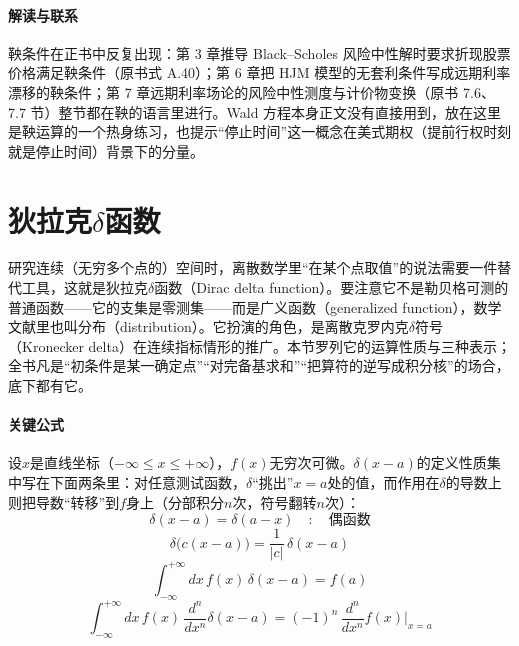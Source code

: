 \paragraph{解读与联系}
鞅条件在正书中反复出现：第 3 章推导 Black--Scholes 风险中性解时要求折现股票价格满足鞅条件（原书式 A.40）；第 6 章把 HJM 模型的无套利条件写成远期利率漂移的鞅条件；第 7 章远期利率场论的风险中性测度与计价物变换（原书 7.6、7.7 节）整节都在鞅的语言里进行。Wald 方程本身正文没有直接用到，放在这里是鞅运算的一个热身练习，也提示“停止时间”这一概念在美式期权（提前行权时刻就是停止时间）背景下的分量。

\section{狄拉克$\delta$函数}

研究连续（无穷多个点的）空间时，离散数学里“在某个点取值”的说法需要一件替代工具，这就是狄拉克$\delta$函数（Dirac delta function）。要注意它不是勒贝格可测的普通函数——它的支集是零测集——而是广义函数（generalized function），数学文献里也叫分布（distribution）。它扮演的角色，是离散克罗内克$\delta$符号（Kronecker delta）在连续指标情形的推广。本节罗列它的运算性质与三种表示；全书凡是“初条件是某一确定点”“对完备基求和”“把算符的逆写成积分核”的场合，底下都有它。

\paragraph{关键公式}
设$x$是直线坐标（$-\infty\le x\le+\infty$），$f(x)$无穷次可微。$\delta(x-a)$的定义性质集中写在下面两条里：对任意测试函数，$\delta$“挑出”$x=a$处的值，而作用在$\delta$的导数上则把导数“转移”到$f$身上（分部积分$n$次，符号翻转$n$次）：
\begin{equation*}
\delta(x-a)=\delta(a-x)\quad:\quad\text{偶函数}
\end{equation*}
\begin{equation*}
\delta\bigl(c(x-a)\bigr)=\frac{1}{|c|}\,\delta(x-a)
\end{equation*}
\begin{equation*}
\int_{-\infty}^{+\infty}dx\,f(x)\,\delta(x-a)=f(a)
\tag{A.5}
\end{equation*}
\begin{equation*}
\int_{-\infty}^{+\infty}dx\,f(x)\,\frac{d^n}{dx^n}\delta(x-a)
=(-1)^n\,\frac{d^n}{dx^n}f(x)\bigr|_{x=a}
\tag{A.6}
\end{equation*}


